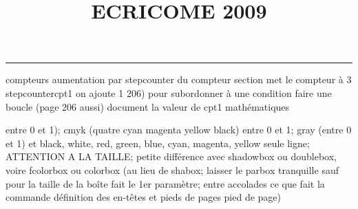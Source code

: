 \documentclass[11pt]{article}%
\title{\bf \vspace{-2cm} ECRICOME 2009} %
\author{} %
\date{} %
\renewcommand{\headrulewidth}{0pt}%
\renewcommand{\footrulewidth}{0.4pt}%
\begin{document}
\maketitle %
\vspace{-1.4cm}\hrule %
\thispagestyle{fancy}

\vspace*{.2cm}



compteurs%
aumentation par stepcounter du compteur section%
met le compteur à 3%
stepcounter{cpt1} on ajoute 1%
206) pour subordonner à une condition %
faire une boucle (page 206 aussi) %
document la valeur de cpt1 
mathématiques\newcommand{\ch}{\operatorname{ch}} 
\newcommand{\sh}{\operatorname{sh}}
\renewcommand{\tanh}{\operatorname{th}}
\renewcommand{\sinh}{\operatorname{sh}}
\renewcommand{\cosh}{\operatorname{ch}}
\newcommand{\argsh}{\operatorname{argsh}}
\newcommand{\argch}{\operatorname{argch}}
\newcommand{\argth}{\operatorname{argth}}
\newcommand{\Id}{\operatorname{Id}}
\renewcommand{\leq}{\leq}
\renewcommand{\geq}{\geq }

\newcommand{\dlim}{\lim}
\newcommand{\dsum}{\sum}
\newcommand{\dprod}{\prod}



entre 0 et 1); cmyk (quatre cyan magenta yellow black) entre 0 et 1;
gray (entre 0 et 1) et black, white, red, green, blue, cyan, magenta,
yellow%
seule ligne; ATTENTION A LA TAILLE; petite différence avec shadowbox ou
doublebox, voire fcolorbox ou colorbox (au lieu de shabox; laisser le
parbox tranquille sauf pour la taille de la boîte
\newcommand{\Tbox}[1]{\begin{center} \shabox{\parbox{0.6
\linewidth}{#1}} \end{center}} %
fait le 1er paramètre; entre accolades ce que fait la commande
définition des en-têtes et pieds de pages\pagestyle{fancy}
\chead{}
\rfoot[ \ \thepage]{\thepage}
\cfoot{}
\lfoot{}
\thispagestyle{fancy} %
pied de page)\renewcommand{\footrulewidth}{0.4pt}
\renewcommand{\headrulewidth}{0.4pt}
\end{document}
